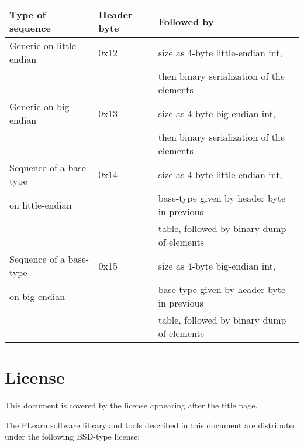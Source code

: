 \documentclass[11pt]{book}
\begin{document}
\begin{tabular}{|l|l|l|}
Type of sequence         & Header byte & Followed by \\ \hline
Generic on little-endian & 0x12        & size as 4-byte little-endian int, \\
                         &             & then binary serialization of the elements \\ \hline
Generic on big-endian    & 0x13        & size as 4-byte big-endian int, \\ 
                         &             & then binary serialization of the elements \\ \hline
Sequence of a base-type  & 0x14        & size as 4-byte little-endian int, \\ 
on little-endian         &             & base-type given by header byte in previous \\
                         &             & table, followed by binary dump of elements \\ \hline
Sequence of a base-type  & 0x15        & size as 4-byte big-endian int, \\ 
on big-endian            &             & base-type given by header byte in previous \\
                         &             & table, followed by binary dump of elements \\ \hline
\end{tabular}


\chapter*{License}

This document is covered by the license appearing after the title page.

\vspace*{.5cm}

The PLearn software library and tools described in this document are
distributed under the following BSD-type license:
\end{document}
